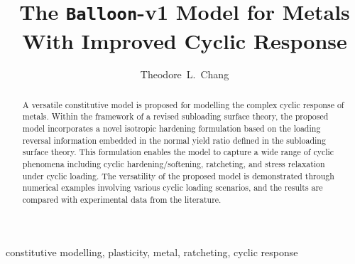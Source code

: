 \documentclass[3p,sort&compress,11pt,fleqn,review]{elsarticle}
\begin{document}
\linenumbers
\begin{abstract}
    \begin{linenumbers}
        A versatile constitutive model is proposed for modelling the complex cyclic response of metals.
        Within the framework of a revised subloading surface theory, the proposed model incorporates a novel isotropic hardening formulation based on the loading reversal information embedded in the normal yield ratio defined in the subloading surface theory.
        This formulation enables the model to capture a wide range of cyclic phenomena including cyclic hardening/softening, ratcheting, and stress relaxation under cyclic loading.
        The versatility of the proposed model is demonstrated through numerical examples involving various cyclic loading scenarios, and the results are compared with experimental data from the literature.
    \end{linenumbers}
\end{abstract}
\begin{keyword}
    constitutive modelling\sep
    plasticity\sep
    metal\sep
    ratcheting\sep
    cyclic response
\end{keyword}
\begin{frontmatter}
    \title{The \texttt{Balloon}-v1 Model for Metals With Improved Cyclic Response}
    \author[add1]{Theodore~L.~Chang}
    \address[add1]{IRIS Adlershof, Humboldt-Universität zu Berlin, Berlin, Germany, 12489.}
\end{frontmatter}




% 
\clearpage

\end{document}
